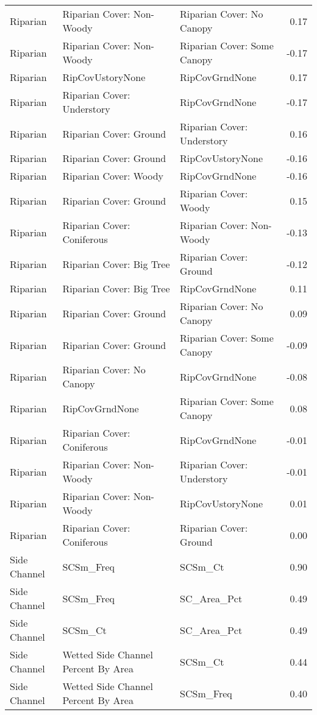 \documentclass[
  12pt,
]{article}
\begin{document}
\begin{longtable}[t]{>{\raggedright\arraybackslash}p{1in}>{\raggedright\arraybackslash}p{2in}>{\raggedright\arraybackslash}p{2in}r}
\addlinespace
Riparian & Riparian Cover: Non-Woody & Riparian Cover: No Canopy & 0.17\\
Riparian & Riparian Cover: Non-Woody & Riparian Cover: Some Canopy & -0.17\\
Riparian & RipCovUstoryNone & RipCovGrndNone & 0.17\\
Riparian & Riparian Cover: Understory & RipCovGrndNone & -0.17\\
Riparian & Riparian Cover: Ground & Riparian Cover: Understory & 0.16\\
\addlinespace
Riparian & Riparian Cover: Ground & RipCovUstoryNone & -0.16\\
Riparian & Riparian Cover: Woody & RipCovGrndNone & -0.16\\
Riparian & Riparian Cover: Ground & Riparian Cover: Woody & 0.15\\
Riparian & Riparian Cover: Coniferous & Riparian Cover: Non-Woody & -0.13\\
Riparian & Riparian Cover: Big Tree & Riparian Cover: Ground & -0.12\\
\addlinespace
Riparian & Riparian Cover: Big Tree & RipCovGrndNone & 0.11\\
Riparian & Riparian Cover: Ground & Riparian Cover: No Canopy & 0.09\\
Riparian & Riparian Cover: Ground & Riparian Cover: Some Canopy & -0.09\\
Riparian & Riparian Cover: No Canopy & RipCovGrndNone & -0.08\\
Riparian & RipCovGrndNone & Riparian Cover: Some Canopy & 0.08\\
\addlinespace
Riparian & Riparian Cover: Coniferous & RipCovGrndNone & -0.01\\
Riparian & Riparian Cover: Non-Woody & Riparian Cover: Understory & -0.01\\
Riparian & Riparian Cover: Non-Woody & RipCovUstoryNone & 0.01\\
Riparian & Riparian Cover: Coniferous & Riparian Cover: Ground & 0.00\\
\hline
Side Channel & SCSm\_Freq & SCSm\_Ct & 0.90\\
\addlinespace
Side Channel & SCSm\_Freq & SC\_Area\_Pct & 0.49\\
Side Channel & SCSm\_Ct & SC\_Area\_Pct & 0.49\\
Side Channel & Wetted Side Channel Percent By Area & SCSm\_Ct & 0.44\\
Side Channel & Wetted Side Channel Percent By Area & SCSm\_Freq & 0.40\\

\end{longtable}
\end{document}

